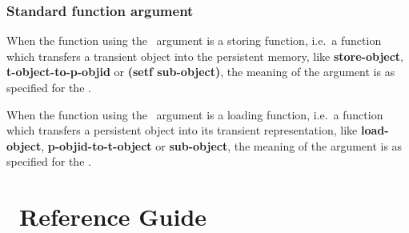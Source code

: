 \subsection[Function argument depth]%
{Standard function argument \protect{}}

When the function using the \ argument is a storing
function, i.e.\ a function which transfers a transient object into the
persistent memory, like {\bf store-object}, {\bf t-object-to-p-objid}
or {\bf (setf sub-object)}, the meaning of the  argument
is as specified for the .

When the function using the \ argument is a loading
function, i.e.\ a function which transfers a persistent object into
its transient representation, like {\bf load-object}, {\bf
  p-objid-to-t-object} or {\bf sub-object}, the meaning of the
 argument is as specified for the .

\sloppy\numberingoff%
\cleardoublepage%
\chapter[Reference Guide]{\protect\thistitle\ Reference Guide}%
